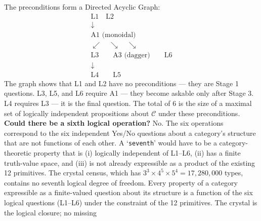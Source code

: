 \documentclass[12pt,a4paper]{article}
\makeatletter
\renewcommand{\_}{\ig@origunderscore\discretionary{}{}{}}
\makeatother
\begin{document}
The preconditions form a Directed Acyclic Graph:
\[
\begin{array}{c}
\text{L1} \quad \text{L2} \\
\downarrow \\
\text{A1 (monoidal)} \\
\swarrow \quad \searrow \quad \searrow \\
\text{L3} \qquad \text{A3 (dagger)} \qquad \text{L6} \\
\downarrow \\
\text{L4} \qquad \text{L5}
\end{array}
\]
The graph shows that L1 and L2 have no preconditions --- they are Stage 1 questions. L3, L5, and L6 require A1 --- they
become askable only after Stage 3. L4 requires L3 --- it is the final question. The total of 6 is the size of a maximal
set of logically independent propositions about $\mathcal{C}$ under these preconditions.
\textbf{Could there be a sixth logical operation?} No. The six operations correspond to the six independent Yes/No
questions about a category's structure that are not functions of each other. A `\texttt{seventh}' would have to be a
category-theoretic property that is (i) logically independent of L1--L6, (ii) has a finite truth-value space, and (iii)
is not already expressible as a product of the existing 12 primitives. The crystal census, which has $3^3
\times 4^5 \times 5^4 = 17{,}280{,}000$ types, contains no seventh logical degree of freedom. Every property of a
category expressible as a finite-valued question about its structure is a function of the six logical questions
(L1--L6) under the constraint of the 12 primitives. The crystal is the logical closure; no missing
\end{document}
